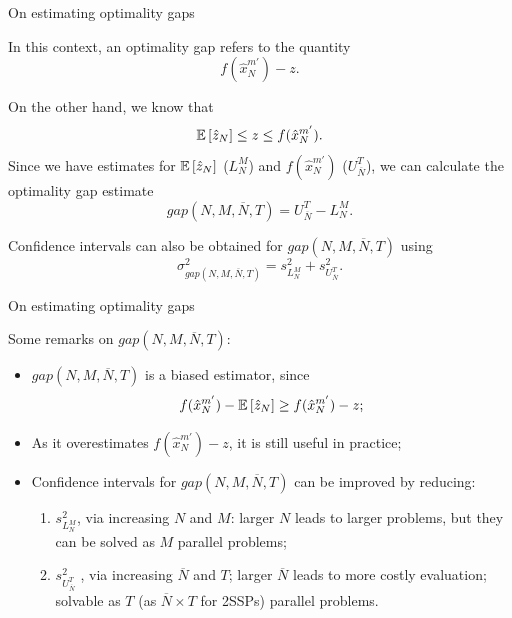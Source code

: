 \begin{frame}{On estimating optimality gaps}

	In this context, an \alert{optimality gap} refers to the quantity
	$$
		f(\hat{x}^{m'}_N) - z.
	$$
	
	\pause
	On the other hand, we know that
	$$
		  \mathbb{E}\left[ \hat{z}_N \right] \le z \le f(\hat{x}^{m'}_N).
	$$
	Since we have estimates for $\mathbb{E}\left[ \hat{z}_N \right]$ ($L_N^M$) and $f(\hat{x}^{m'}_N)$ ($U_{\overline{N}}^T$), we can calculate the \alert{optimality gap} estimate
	\begin{equation*}
		gap(N,M,\overline{N},T) = U_{\overline{N}}^T - L_N^M.
	\end{equation*}
	
	\pause
	Confidence intervals can also be obtained for $gap(N,M,\overline{N},T)$ using   
	$$
		\sigma^2_{gap(N,M,\overline{N},T)} = s^2_{L_N^M} + s^2_{U_{\overline{N}}^T}.
	$$ 
	

\end{frame}



\begin{frame}{On estimating optimality gaps}

Some remarks on $gap(N,M,\overline{N},T)$:
	\begin{itemize}
		\item $gap(N,M,\overline{N},T)$	is a \alert{biased} estimator, since 
		$$
			f(\hat{x}^{m'}_N) - \mathbb{E}\left[ \hat{z}_N \right] \ge f(\hat{x}^{m'}_N) - z;
		$$
		\item As it overestimates $f(\hat{x}^{m'}_N) - z$, it is still useful in practice;
		\item Confidence intervals for $gap(N,M,\overline{N},T)$ can be \alert{improved} by reducing:
			\begin{enumerate}
				\item $s^2_{L_N^M}$, via increasing $N$ and $M$: larger $N$ leads to larger problems, but they can be solved as $M$ \alert{parallel} problems;
				\item $s^2_{U_{\overline{N}}^T}$	, via increasing $\overline{N}$ and $T$; larger $\overline{N}$ leads to more costly evaluation; solvable as $T$ (as $\overline{N} \times T$ for 2SSPs) parallel problems.
			\end{enumerate}
	\end{itemize}	
\end{frame}


